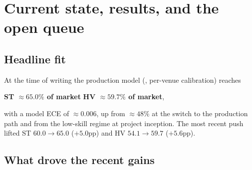 \chapter{Current state, results, and the open queue}
\label{ch:state}

\section{Headline fit}

At the time of writing the production model (, per-venue calibration) reaches
\begin{center}
  \textbf{ST $\approx 65.0\%$ of market} \qquad \textbf{HV $\approx 59.7\%$ of market},
\end{center}
with a model ECE of $\approx 0.006$, up from $\approx 48\%$ at the switch to the production path
and from the low-skill regime at project inception. The most recent push lifted ST
$60.0\to 65.0$ ($+5.0$pp) and HV $54.1\to 59.7$ ($+5.6$pp).

\section{What drove the recent gains}

